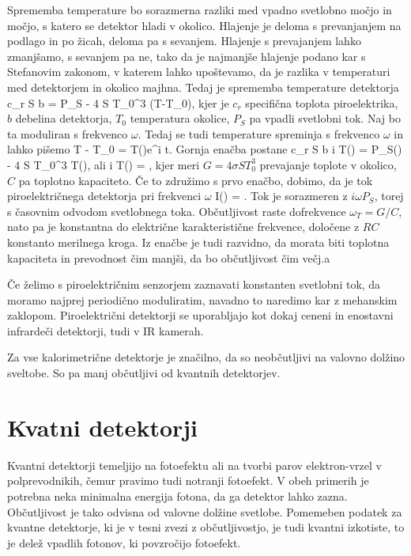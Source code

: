 Sprememba temperature bo sorazmerna razliki med vpadno svetlobno močjo in močjo, s katero
se detektor hladi v okolico. Hlajenje je deloma s prevanjanjem na podlago in po žicah, deloma pa s
sevanjem. Hlajenje s prevajanjem lahko zmanjšamo, s sevanjem pa ne, tako da je najmanjše
hlajenje podano kar s Stefanovim zakonom, v katerem lahko upoštevamo, da je razlika
v temperaturi med detektorjem in okolico majhna. Tedaj je sprememba temperature detektorja
\beq
c_r \varrho S b  = P_S - 4 \sigma S T_0^3 (T-T_0),
\eeq
kjer je $c_r$ specifična toplota piroelektrika, $b$ debelina detektorja, $T_0$ temperatura
okolice, $P_S$ pa vpadli svetlobni tok. Naj bo ta moduliran s frekvenco $\omega$. Tedaj se tudi
temperature spreminja s frekvenco $\omega$ in lahko pišemo
\beq
T - T_0 = T(\omega)e^{i \omega t}.
\eeq
Gornja enačba postane
\beq
c_r \varrho S b i \omega T(\omega) = P_S(\omega) - 4 \sigma S T_0^3 T(\omega),
\eeq
ali
\beq
i \omega T(\omega) = ,
\eeq
kjer meri $G = 4 \sigma S T_0^3$ prevajanje toplote v okolico, $C$ pa toplotno
kapaciteto. Če to združimo s prvo enačbo, dobimo, da je tok piroelektričnega detektorja
pri frekvenci $\omega$ 
\beq
I(\omega) = .
\eeq
Tok je sorazmeren z $i\omega P_S$, torej s časovnim odvodom svetlobnega toka. Občutljivost
raste dofrekvence $\omega_T = G/C$, nato pa je konstantna do električne karakteristične frekvence,
določene z $RC$ konstanto merilnega kroga. Iz enačbe je tudi razvidno, da morata biti toplotna
kapaciteta in prevodnost čim manjši, da bo občutljivost čim večj.a

Če želimo s piroelektričnim senzorjem zaznavati konstanten svetlobni tok, da moramo najprej
periodično moduliratim, navadno to naredimo kar z mehanskim zaklopom. Piroelektrični detektorji
se uporabljajo kot dokaj ceneni in enostavni infrardeči detektorji, tudi v IR kamerah. 

Za vse kalorimetrične detektorje je značilno, da so neobčutljivi na valovno dolžino sveltobe. So
pa manj občutljivi od kvantnih detektorjev.

\section{Kvatni detektorji}

Kvantni detektorji temeljijo na fotoefektu ali na tvorbi parov elektron-vrzel
v polprevodnikih, čemur pravimo tudi notranji fotoefekt. V obeh primerih je potrebna neka
minimalna energija fotona, da ga detektor lahko zazna. Občutljivost je tako odvisna od 
valovne dolžine svetlobe. Pomemeben podatek za kvantne detektorje, ki je v tesni zvezi 
z občutljivostjo, je tudi kvantni izkotiste, to je delež vpadlih fotonov, ki povzročijo fotoefekt.


